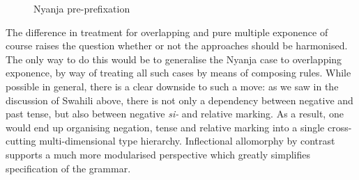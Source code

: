 \documentclass[output=paper
                ,modfonts
                ,nonflat
	        ,collection
	        ,collectionchapter
	        ,collectiontoclongg
 	        ,biblatex
                ,babelshorthands
                ,newtxmath
                ,draftmode
                ,colorlinks, citecolor=brown
] {langscibook}
\begin{document}
{\begin{figure}
  \centering
{}    
  \caption{Nyanja pre-prefixation \citep{Crysmann:14:OUP}}\label{fig:Nyanja}
\end{figure}

The difference in treatment for overlapping and pure multiple
exponence of course raises the question whether or not the approaches
should be harmonised. The only way to do this would be to generalise
the Nyanja case to overlapping exponence, by way of treating all such
cases by means of composing rules. While possible in general, there is
a clear downside to such a move: as we saw in the discussion of
Swahili above, there is not only a dependency between negative and
past tense, but also between negative \textit{si-} and relative
marking. As a result, one would end up organising negation, tense and
relative marking into a single cross-cutting multi-dimensional type
hierarchy. Inflectional allomorphy by contrast supports a much more
modularised perspective which greatly simplifies specification of the
grammar.  

}
\end{document}
